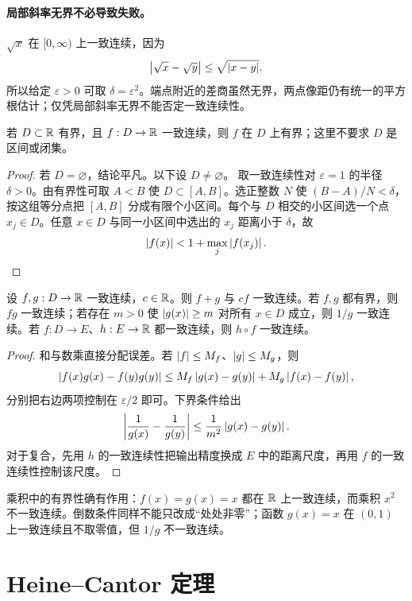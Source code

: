 \paragraph{局部斜率无界不必导致失败。}
\(\sqrt x\) 在 \([0,\infty)\) 上一致连续，因为
\[
 \left|\sqrt x-\sqrt y\right|\le\sqrt{\left|x-y\right|}.
\]
所以给定 \(\varepsilon>0\) 可取 \(\delta=\varepsilon^2\)。端点附近的差商虽然无界，两点像距仍有统一的平方根估计；仅凭局部斜率无界不能否定一致连续性。

\begin{proposition}
若 \(D\subset\mathbb{R}\) 有界，且 \(f:D\to\mathbb{R}\) 一致连续，则 \(f\) 在 \(D\) 上有界；这里不要求 \(D\) 是区间或闭集。
\end{proposition}

\begin{proof}
若 \(D=\varnothing\)，结论平凡。以下设 \(D\ne\varnothing\)。
取一致连续性对 \(\varepsilon=1\) 的半径 \(\delta>0\)。由有界性可取 \(A<B\) 使 \(D\subset[A,B]\)。选正整数 \(N\) 使 \((B-A)/N<\delta\)，按这组等分点把 \([A,B]\) 分成有限个小区间。每个与 \(D\) 相交的小区间选一个点 \(x_j\in D\)。任意 \(x\in D\) 与同一小区间中选出的 \(x_j\) 距离小于 \(\delta\)，故
\[
 \left|f(x)\right|<1+\max_j\left|f(x_j)\right|.
\]
\end{proof}

\begin{proposition}[一致连续函数的运算]
设 \(f,g:D\to\mathbb{R}\) 一致连续，\(c\in\mathbb{R}\)。则 \(f+g\) 与 \(cf\) 一致连续。若 \(f,g\) 都有界，则 \(fg\) 一致连续；若存在 \(m>0\) 使 \(\left|g(x)\right|\ge m\) 对所有 \(x\in D\) 成立，则 \(1/g\) 一致连续。若 \(f:D\to E\)、\(h:E\to\mathbb{R}\) 都一致连续，则 \(h\circ f\) 一致连续。
\end{proposition}

\begin{proof}
和与数乘直接分配误差。若 \(\left|f\right|\le M_f\)、\(\left|g\right|\le M_g\)，则
\[
 \left|f(x)g(x)-f(y)g(y)\right|
 \le M_f\left|g(x)-g(y)\right|+M_g\left|f(x)-f(y)\right|,
\]
分别把右边两项控制在 \(\varepsilon/2\) 即可。下界条件给出
\[
 \left|\frac1{g(x)}-\frac1{g(y)}\right|
 \le\frac1{m^2}\left|g(x)-g(y)\right|.
\]
对于复合，先用 \(h\) 的一致连续性把输出精度换成 \(E\) 中的距离尺度，再用 \(f\) 的一致连续性控制该尺度。
\end{proof}

乘积中的有界性确有作用：\(f(x)=g(x)=x\) 都在 \(\mathbb{R}\) 上一致连续，而乘积 \(x^2\) 不一致连续。倒数条件同样不能只改成“处处非零”；函数 \(g(x)=x\) 在 \((0,1)\) 上一致连续且不取零值，但 \(1/g\) 不一致连续。

\section{Heine--Cantor 定理}

